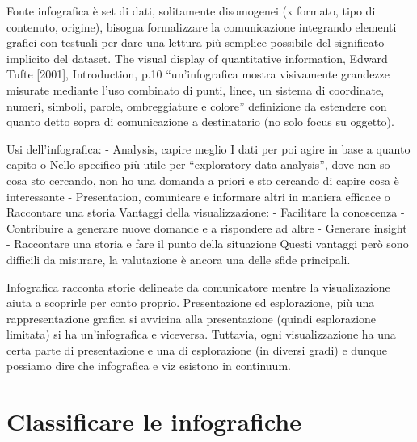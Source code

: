Fonte infografica è set di dati, solitamente disomogenei (x formato, tipo di contenuto, origine), bisogna formalizzare la comunicazione integrando elementi grafici con testuali per dare una lettura più semplice possibile del significato implicito del dataset.
The visual display of quantitative information, Edward Tufte [2001], Introduction, p.10 “un'infografica mostra visivamente grandezze misurate mediante l'uso combinato di punti, linee, un sistema di coordinate, numeri, simboli, parole, ombreggiature e colore” definizione da estendere con quanto detto sopra di comunicazione a destinatario (no solo focus su oggetto). 

Usi dell'infografica:
-	Analysis, capire meglio I dati per poi agire in base a quanto capito 
    o	Nello specifico più utile per “exploratory data analysis”, dove non so cosa sto cercando, non ho una domanda a priori e sto cercando di capire cosa è interessante
-	Presentation, comunicare e informare altri in maniera efficace
    o	Raccontare una storia
Vantaggi della visualizzazione:
-	Facilitare la conoscenza 
-	Contribuire a generare nuove domande e a rispondere ad altre
-	Generare insight
-	Raccontare una storia e fare il punto della situazione
Questi vantaggi però sono difficili da misurare, la valutazione è ancora una delle sfide principali. 



Infografica racconta storie delineate da comunicatore mentre la visualizazione aiuta a scoprirle per conto proprio.
Presentazione ed esplorazione, più una rappresentazione grafica si avvicina alla presentazione (quindi esplorazione limitata) si ha un'infografica e viceversa. Tuttavia, ogni visualizzazione ha una certa parte di presentazione e una di esplorazione (in diversi gradi) e dunque possiamo dire che infografica e viz esistono in continuum.


\section{Classificare le infografiche}

